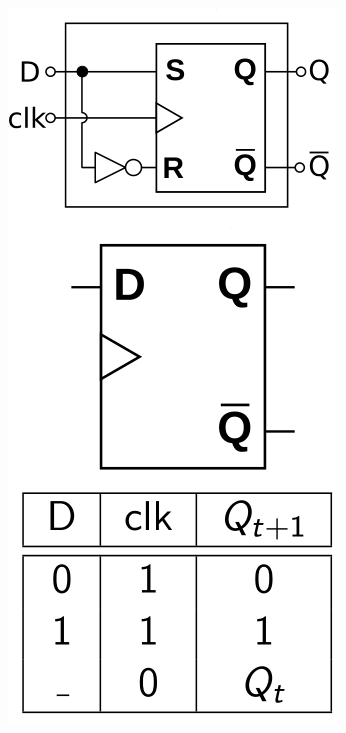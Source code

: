 \documentclass[10pt]{beamer}
\begin{document}
\begin{frame}
\begin{columns}
\begin{figure}[h!]
    \centering
    \includegraphics[scale=0.18]{flipD.png}
\end{figure}


\end{columns}

\end{frame}
\end{document}
